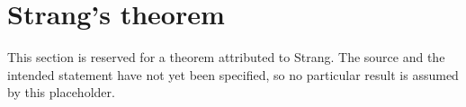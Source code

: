 \def\topic{Strang's theorem}

\section{Strang's theorem}
This section is reserved for a theorem attributed to Strang. The source
and the intended statement have not yet been specified, so no particular
result is assumed by this placeholder.

